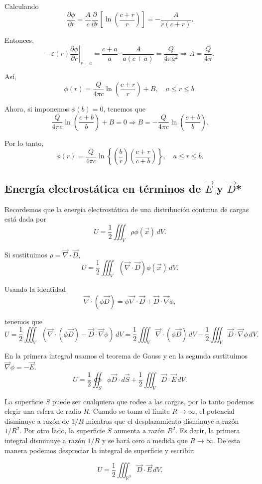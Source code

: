 \begin{ejemplo}
Calculando
$$\frac{\partial \phi}{\partial r} =  \frac{A}{c} \frac{\partial}{\partial r} \left[\ln\left(\frac{c+r}{r}  \right) \right] = - \frac{A}{r(c+r)}.$$

Entonces,
$$-\varepsilon(r) \left. \frac{\partial \phi}{\partial r} \right|_{r = a} =  \frac{c+a}{a} \cdot \frac{A}{a(c+a)} = \frac{Q}{4\pi a^2} \Rightarrow A = \frac{Q}{4\pi}.$$

Así,
$$\phi(r) = \frac{Q}{4\pi c} \ln\left(\frac{c+r}{r} \right) + B, \quad a \leq r \leq b.$$

Ahora, si imponemos $\phi(b) = 0$, tenemos que 
$$\frac{Q}{4\pi c} \ln\left(\frac{c+b}{b} \right) + B = 0 \Rightarrow B = - \frac{Q}{4\pi c} \ln\left(\frac{c+b}{b} \right).$$

Por lo tanto,
$$\phi(r) =  \frac{Q}{4\pi c} \ln \left\{\left( \frac{b}{r}\right) \left( \frac{c+r}{c+b}\right) \right\}, \quad a \leq r\leq b.$$
\end{ejemplo}

\subsection{Energía electrostática en términos de \texorpdfstring{$\Vec{E}$}{TEXT} y \texorpdfstring{$\Vec{D}$}{TEXT}*}

Recordemos que la energía electrostática de una distribución continua de cargas está dada por
$$U = \frac{1}{2} \iiint_{V} \rho \phi(\Vec{x}) \,dV.$$

Si sustituimos $\rho = \Vec{\nabla} \cdot \Vec{D}$,
$$U = \frac{1}{2} \iiint_{V} (\Vec{\nabla} \cdot \vec{D}) \phi(\Vec{x}) \,dV.$$

Usando la identidad 
$$\Vec{\nabla}\cdot (\phi \Vec{D}) = \phi \Vec{\nabla} \cdot \Vec{D} + \Vec{D} \cdot \Vec{\nabla} \phi,$$

tenemos que
$$U = \frac{1}{2} \iiint_{V} (\Vec{\nabla}\cdot (\phi \Vec{D}) -  \Vec{D} \cdot \Vec{\nabla} \phi) \,dV = \frac{1}{2} \iiint_{V} \Vec{\nabla} \cdot (\phi \Vec{D}) \,dV - \frac{1}{2} \iiint_{V} \Vec{D} \cdot \Vec{\nabla} \phi \,dV.$$

En la primera integral usamos el teorema de Gauss y en la segunda sustituimos $\Vec{\nabla} \phi = - \Vec{E}$.
$$U = \frac{1}{2} \oiint_{S} \phi \Vec{D} \cdot d\Vec{S} + \frac{1}{2} \iiint_{V} \Vec{D} \cdot \Vec{E} \,dV.$$

La superficie $S$ puede ser cualquiera que rodee a las cargas, por lo tanto podemos elegir una esfera de radio $R$. Cuando se toma el límite $R \to \infty$, el potencial disminuye a razón de $1/R$ mientras que el desplazamiento disminuye a razón $1/R^2$. Por otro lado, la superficie $S$ aumenta a razón $R^2$. Es decir, la primera integral disminuye a razón $1/R$ y se hará cero a medida que $R \to \infty$. De esta manera podemos despreciar la integral de superficie y escribir:
\begin{shaded}
    $$U = \frac{1}{2} \iiint_{\mathbb{R}^3} \Vec{D} \cdot \Vec{E} \,dV.$$
\end{shaded}


